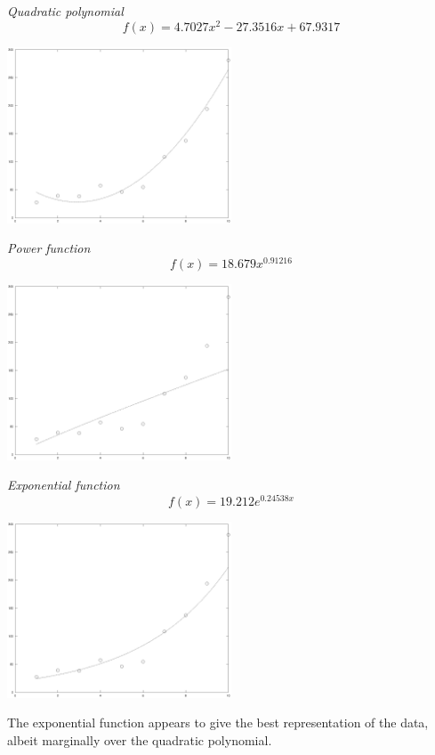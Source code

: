 \documentclass[11pt,a4paper]{article}
\begin{document}
	\textit{Quadratic polynomial}
	$$f(x)=4.7027x^2-27.3516x+67.9317$$
	\begin{center}
		\includegraphics[width=0.5\textwidth]{qp.eps}
	\end{center}
	\textit{Power function}
	$$f(x)=18.679x^{0.91216}$$
	\begin{center}
		\includegraphics[width=0.5\textwidth]{pf.eps}
	\end{center}
	\textit{Exponential function}
	$$f(x)=19.212e^{0.24538x}$$
	\begin{center}
		\includegraphics[width=0.5\textwidth]{ef.eps}
	\end{center}
	The exponential function appears to give the best representation of the data, albeit marginally over the quadratic polynomial.
	
\end{document}
